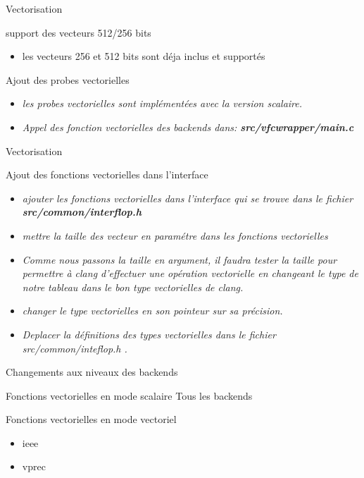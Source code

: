 \documentclass{beamer}
\begin{document}
\begin{frame}{Vectorisation}         
\begin{block}{support des vecteurs 512/256 bits}
     \begin{itemize}
         \item les vecteurs 256 et 512 bits sont déja inclus et supportés
     \end{itemize}
     
\end{block}
\begin{block}{Ajout des probes vectorielles}
    \begin{itemize}
    \item\textit{les probes vectorielles sont implémentées avec la version scalaire.}
    \item\textit{Appel des fonction vectorielles des backends dans: \textbf{src/vfcwrapper/main.c} } 
   \end{itemize}  
\end{block}
 \end{frame}

\begin{frame}{Vectorisation}         
\begin{block}{Ajout des fonctions vectorielles dans l’interface}
  \begin{itemize}
  \item\textit{ajouter les fonctions vectorielles dans l'interface qui se trouve dans le fichier \textbf{src/common/interflop.h}} 
 \item\textit{mettre la taille des vecteur en paramétre dans les fonctions vectorielles}
 \item\textit{Comme nous passons la taille en argument, il faudra tester la taille pour permettre à clang d’effectuer une opération vectorielle en changeant le type de notre tableau dans le bon type vectorielles de clang.}
 \item\textit{changer le type vectorielles en son pointeur sur sa précision.}
 \item\textit{Deplacer la définitions des types vectorielles dans le fichier src/common/inteflop.h .}
   \end{itemize}
    
\end{block}
\end{frame}

\begin{frame}{Changements aux niveaux des backends}

  \begin{block}{Fonctions vectorielles en mode scalaire}
    Tous les backends
  \end{block}

  \begin{block}{Fonctions vectorielles en mode vectoriel}
    \begin{itemize}
    \item ieee
    \item vprec
    \end{itemize}
  \end{block}

\end{frame}
\end{document}
